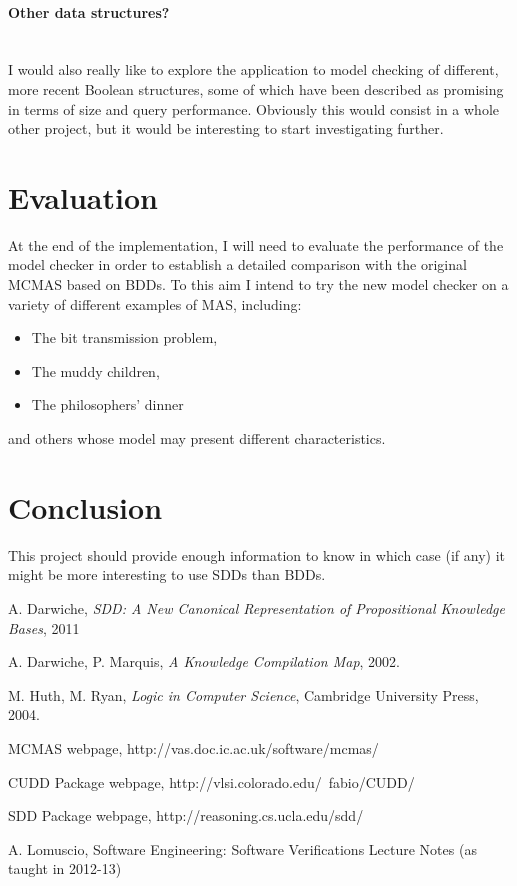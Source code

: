 \documentclass{article}
\newcommand{\myparagraph}[1]{\paragraph{#1}\mbox{}\\}
\begin{document}
\myparagraph{Other data structures?}

I would also really like to explore the application to model checking of different, more recent Boolean structures, some of which have been described as promising in terms of size and query performance. Obviously this would consist in a whole other project, but it would be interesting to start investigating further.

\clearpage
\section{Evaluation}

At the end of the implementation, I will need to evaluate the performance of the model checker in order to establish a detailed comparison with the original MCMAS based on BDDs.
To this aim I intend to try the new model checker on a variety of different examples of MAS, including: 
\begin{itemize}
\item The bit transmission problem,
\item The muddy children,
\item The philosophers' dinner
\end{itemize}
and others whose model may present different characteristics. 

\section{Conclusion}

This project should provide enough information to know in which case (if any) it might be more interesting to use SDDs than BDDs.


\begin{thebibliography}{9}

A. Darwiche,\emph{ SDD: A New Canonical Representation of Propositional Knowledge Bases}, 2011

  A. Darwiche, P. Marquis,
  \emph{A Knowledge Compilation Map}, 2002.

 M. Huth, M. Ryan, 
\emph{Logic in Computer Science},
Cambridge University Press, 2004.

 MCMAS webpage, http://vas.doc.ic.ac.uk/software/mcmas/

 CUDD Package webpage, http://vlsi.colorado.edu/~fabio/CUDD/

 SDD Package webpage, http://reasoning.cs.ucla.edu/sdd/

 A. Lomuscio, Software Engineering: Software Verifications Lecture Notes (as taught in 2012-13)


\end{thebibliography}
\end{document}
